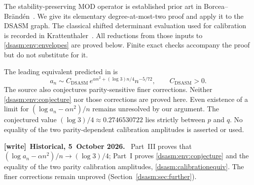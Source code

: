 \documentclass[11pt,letterpaper]{article}
\theoremstyle{remark}\newtheorem{remark}[theorem]{Remark}
\newcommand{\DS}{\mathrm{DSASM}}\newcommand{\ASM}{\mathrm{ASM}}
\newenvironment{writenote}[1][]{\par\smallskip\begingroup\small
 \noindent\textbf{[write]}\if\relax\detokenize{#1}\relax\else~\textbf{#1.}\fi\ }%
 {\par\endgroup\smallskip}
\begin{document}
The stability-preserving MOD operator is established prior art in
Borcea--Br\"and\'en~\cite[Section 8.4]{bb2}. We give its elementary
degree-at-most-two proof and apply it to the DSASM graph. The classical
shifted determinant evaluation used for calibration is recorded in
Krattenthaler~\cite[Theorem 34, Equation (3.24)]{kratt}. All reductions
from those inputs to \eqref{dsasm:env:envelopes} are proved below. Finite exact
checks accompany the proof but do not substitute for it.

The leading equivalent predicted in \cite[Conjecture 11.1]{bfk} is
\begin{equation}\label{dsasm:env:conjecture}
 a_n\sim C_{\DS}\,e^{\alpha n^2+(\log3)n/4}n^{-5/72},
 \qquad C_{\DS}>0.
\end{equation}
The source also conjectures parity-sensitive finer corrections.
Neither \eqref{dsasm:env:conjecture} nor those corrections are proved here.
Even existence of a limit for $(\log a_n-\alpha n^2)/n$ remains
unresolved by our argument. The conjectured value
$(\log3)/4\approx0.2746530722$ lies strictly between $p$ and $q$.
No equality of the two parity-dependent calibration amplitudes is
asserted or used.
\begin{writenote}[Historical, 5~October 2026]
Part~III proves that $(\log a_n-\alpha n^2)/n\to(\log3)/4$; Part~I proves \eqref{dsasm:env:conjecture} and the equality of the two parity calibration amplitudes, \eqref{dsasm:calibrationequiv}. The finer corrections remain unproved (Section~\ref{dsasm:sec:further}).
\end{writenote}
\end{document}
